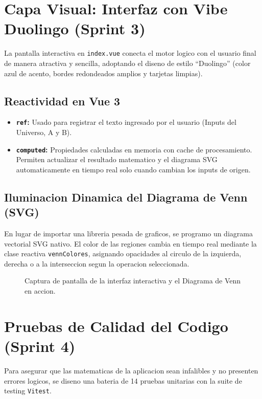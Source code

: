 \documentclass[12pt,a4paper]{article}
\begin{document}
\section{Capa Visual: Interfaz con Vibe Duolingo (Sprint 3)}
La pantalla interactiva en \texttt{index.vue} conecta el motor logico con el usuario final de manera atractiva y sencilla, adoptando el diseno de estilo ``Duolingo'' (color azul de acento, bordes redondeados amplios y tarjetas limpias).

\subsection{Reactividad en Vue 3}
\begin{itemize}
    \item \textbf{\texttt{ref}:} Usado para registrar el texto ingresado por el usuario (Inputs del Universo, A y B).
    \item \textbf{\texttt{computed}:} Propiedades calculadas en memoria con cache de procesamiento. Permiten actualizar el resultado matematico y el diagrama SVG automaticamente en tiempo real solo cuando cambian los inputs de origen.
\end{itemize}

\subsection{Iluminacion Dinamica del Diagrama de Venn (SVG)}
En lugar de importar una libreria pesada de graficos, se programo un diagrama vectorial SVG nativo. El color de las regiones cambia en tiempo real mediante la clase reactiva \texttt{vennColores}, asignando opacidades al circulo de la izquierda, derecha o a la interseccion segun la operacion seleccionada.

\begin{figure}[H]
    \centering
    \caption{Captura de pantalla de la interfaz interactiva y el Diagrama de Venn en accion.}
    \label{fig:interfaz}
\end{figure}

\section{Pruebas de Calidad del Codigo (Sprint 4)}
Para asegurar que las matematicas de la aplicacion sean infalibles y no presenten errores logicos, se diseno una bateria de 14 pruebas unitarias con la suite de testing \texttt{Vitest}.
\end{document}
